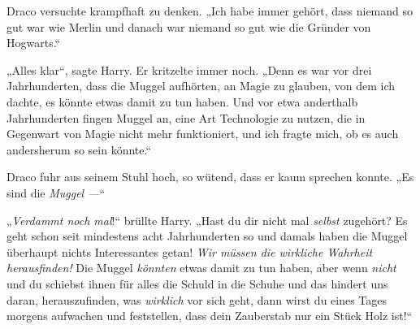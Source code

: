 Draco versuchte krampfhaft zu denken.
„Ich habe immer gehört, dass niemand so gut war wie Merlin und danach war niemand so gut wie die Gründer von Hogwarts.“

„Alles klar“, sagte Harry. Er kritzelte immer noch.
„Denn es war vor drei Jahrhunderten, dass die Muggel aufhörten, an Magie zu glauben, von dem ich dachte, es könnte etwas damit zu tun haben. Und vor etwa anderthalb Jahrhunderten fingen Muggel an, eine Art Technologie zu nutzen, die in Gegenwart von Magie nicht mehr funktioniert, und ich fragte mich, ob es auch andersherum so sein könnte.“

Draco fuhr aus seinem Stuhl hoch, so wütend, dass er kaum sprechen konnte.
„Es sind die \emph{Muggel —}“

„\emph{Verdammt noch mal}!“ brüllte Harry.
„Hast du dir nicht mal \emph{selbst} zugehört? Es geht schon seit mindestens acht Jahrhunderten so und damals haben die Muggel überhaupt nichts Interessantes getan! \emph{Wir müssen die wirkliche Wahrheit herausfinden!} Die Muggel \emph{könnten} etwas damit zu tun haben, aber wenn \emph{nicht} und du schiebst ihnen für alles die Schuld in die Schuhe und das hindert uns daran, herauszufinden, was \emph{wirklich} vor sich geht, dann wirst du eines Tages morgens aufwachen und feststellen, dass dein Zauberstab nur ein Stück Holz ist!“

